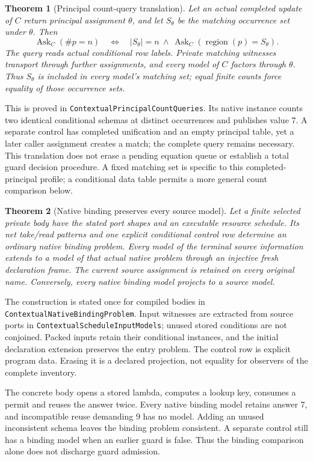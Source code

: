 \documentclass[11pt]{article}
\newtheorem{theorem}{Theorem}
\newcommand{\code}[1]{\texttt{\small #1}}
\begin{document}
\begin{theorem}[Principal count-query translation]
Let an actual completed update of $C$ return principal assignment
$\theta$, and let $S_\theta$ be the matching occurrence set under
$\theta$. Then
\[
 \operatorname{Ask}_{C}(\#p=n)
 \quad\Longleftrightarrow\quad
 |S_\theta|=n\ \land\
 \operatorname{Ask}_{C}(\operatorname{region}(p)=S_\theta).
\]
The query reads actual conditional row labels. Private matching witnesses
transport through further assignments, and every model of $C$ factors
through $\theta$. Thus $S_\theta$ is included in every model's matching
set; equal finite counts force equality of those occurrence sets.
\end{theorem}
This is proved in
\code{ContextualPrincipalCountQueries}.
Its native instance counts two identical conditional schemas at distinct
occurrences and publishes value $7$. A separate control has completed
unification and an empty principal table, yet a later caller assignment
creates a match; the complete query remains necessary. This translation
does not erase a pending equation queue or establish a total guard
decision procedure. A fixed matching set is specific to this
completed-principal profile; a conditional data table permits a more
general count comparison below.

\begin{theorem}[Native binding preserves every source model]
Let a finite selected private body have the stated port shapes and an
executable resource schedule. Its net take/read patterns and one explicit
conditional control row determine an ordinary native binding problem.
Every model of the terminal source information extends to a model of
that actual native problem through an injective fresh declaration frame.
The current source assignment is retained on every original name.
Conversely, every native binding model projects to a source model.
\end{theorem}
The construction is stated once for compiled bodies in
\code{ContextualNativeBindingProblem}.
Input witnesses are extracted from source ports in
\code{ContextualScheduleInputModels}; unused stored conditions are not
conjoined. Packed inputs retain their conditional instances, and the
initial declaration extension preserves the entry problem. The control
row is explicit program data. Erasing it is a declared projection, not
equality for observers of the complete inventory.

The concrete body opens a stored lambda, computes a lookup key, consumes
a permit and reuses the answer twice. Every native binding model retains
answer $7$, and incompatible reuse demanding $9$ has no model. Adding an
unused inconsistent schema leaves the binding problem consistent.
A separate control still has a binding model when an earlier guard is
false. Thus the binding comparison alone does not discharge guard admission.
\end{document}
